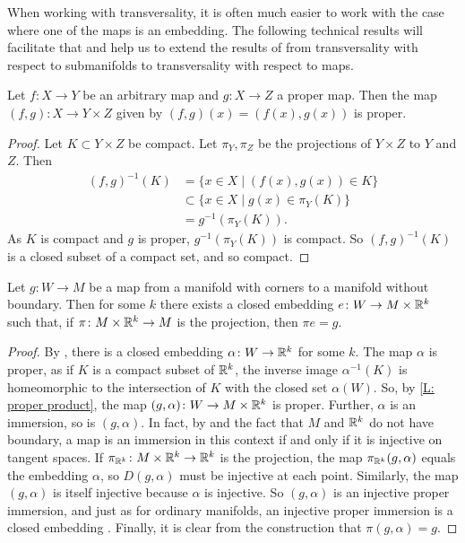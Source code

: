 When working with transversality, it is often much easier to work with the case where one of the maps is an embedding. 
The following technical results will facilitate that and help us to extend the results of \cite{GuPo74} from transversality with respect to submanifolds to transversality with respect to maps.

\begin{lemma}\label{L: proper product}
	Let $f \colon X \to Y$ be an arbitrary map and $g \colon X \to Z$ a proper map. 
	Then the map $(f,g) \colon X \to Y \times Z$ given by $(f,g)(x)=(f(x),g(x))$ is proper.
\end{lemma}
\begin{proof}
	Let $K \subset Y \times Z$ be compact. 
	Let $\pi_Y,\pi_Z$ be the projections of $Y \times Z$ to $Y$ and $Z$. Then 
	\begin{align*}
		(f,g)^{-1}(K) &= \{x \in X \mid (f(x),g(x)) \in K \}\\
		&\subset \{ x \in X \mid g(x) \in \pi_Y(K)\}\\
		&= g^{-1}(\pi_Y(K)).
	\end{align*} 
	As $K$ is compact and $g$ is proper, $g^{-1}(\pi_Y(K))$ is compact. 
	So $(f,g)^{-1}(K)$ is a closed subset of a compact set, and so compact.
\end{proof}

\begin{corollary}\label{C: embed V}
Let $g \colon W \to M$ be a map from a manifold with corners to a manifold without boundary. 
Then for some $k$ there exists a closed embedding $e \colon W \to M \times \mathbb{R}^k$ such that, if $\pi \colon M \times \mathbb{R}^k \to M$ is the projection, then $\pi e = g$. 
\end{corollary}
\begin{proof}
By \cite[Corollary 11.3.10]{MaDo92}, there is a closed embedding $\alpha \colon W \to \mathbb{R}^k$ for some $k$. 
The map $\alpha$ is proper, as if $K$ is a compact subset of $\mathbb{R}^k$, the inverse image $\alpha^{-1}(K)$ is homeomorphic to the intersection of $K$ with the closed set $\alpha(W)$.
So, by \cref{L: proper product}, the map $(g,\alpha) \colon W \to M \times \mathbb{R}^k$ is proper.
Further, $\alpha$ is an immersion, so is $(g,\alpha)$.
In fact, by \cite[Theorem 3.2.6]{MaDo92} and the fact that $M$ and $\mathbb{R}^k$ do not have boundary, a map is an immersion in this context if and only if it is injective on tangent spaces.
If $\pi_{\mathbb{R}^k} \colon M \times \mathbb{R}^k \to \mathbb{R}^k$ is the projection, the map $\pi_{\mathbb{R}^k}(g,\alpha)$ equals the embedding $\alpha$, so $D(g,\alpha)$ must be injective at each point.
Similarly, the map $(g,\alpha)$ is itself injective because $\alpha$ is injective.  
So $(g,\alpha)$ is an injective proper immersion, and just as for ordinary manifolds, an injective proper immersion is a closed embedding \cite[Proposition 3.3.4]{MaDo92}.
Finally, it is clear from the construction that $\pi (g,\alpha) = g$.
\end{proof}

